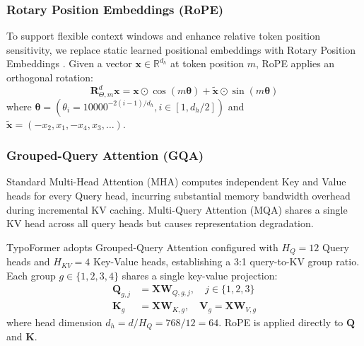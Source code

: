 \documentclass[10pt,journal,compsoc]{IEEEtran}
\begin{document}
\subsubsection{Rotary Position Embeddings (RoPE)}
To support flexible context windows and enhance relative token position sensitivity, we replace static learned positional embeddings with Rotary Position Embeddings \cite{su2024roformer}. Given a vector $\mathbf{x} \in \mathbb{R}^{d_h}$ at token position $m$, RoPE applies an orthogonal rotation:
\begin{equation}
\mathbf{R}_{\Theta, m}^d \mathbf{x} = \mathbf{x} \odot \cos(m\boldsymbol{\theta}) + \tilde{\mathbf{x}} \odot \sin(m\boldsymbol{\theta})
\end{equation}
where $\boldsymbol{\theta} = (\theta_i = 10000^{-2(i-1)/d_h}, i \in [1, d_h/2])$ and $\tilde{\mathbf{x}} = (-x_2, x_1, -x_4, x_3, \dots)$.

\subsubsection{Grouped-Query Attention (GQA)}
Standard Multi-Head Attention (MHA) computes independent Key and Value heads for every Query head, incurring substantial memory bandwidth overhead during incremental KV caching. Multi-Query Attention (MQA) shares a single KV head across all query heads but causes representation degradation. 

TypoFormer adopts Grouped-Query Attention \cite{ainslie2023gqa} configured with $H_Q = 12$ Query heads and $H_{KV} = 4$ Key-Value heads, establishing a 3:1 query-to-KV group ratio. Each group $g \in \{1, 2, 3, 4\}$ shares a single key-value projection:
\begin{align}
\mathbf{Q}_{g,j} &= \mathbf{X} \mathbf{W}_{Q,g,j}, \quad j \in \{1, 2, 3\} \\
\mathbf{K}_g &= \mathbf{X} \mathbf{W}_{K,g}, \quad \mathbf{V}_g = \mathbf{X} \mathbf{W}_{V,g}
\end{align}
where head dimension $d_h = d / H_Q = 768 / 12 = 64$. RoPE is applied directly to $\mathbf{Q}$ and $\mathbf{K}$.
\end{document}
